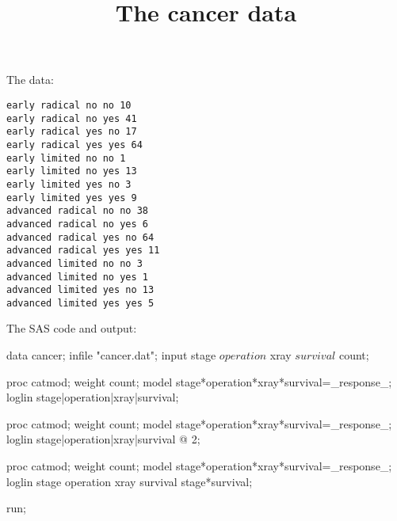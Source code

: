 \documentclass{article}
\title{The cancer data}
\begin{document}
\maketitle
The data:
\begin{verbatim}
early radical no no 10
early radical no yes 41
early radical yes no 17
early radical yes yes 64
early limited no no 1
early limited no yes 13
early limited yes no 3
early limited yes yes 9
advanced radical no no 38
advanced radical no yes 6
advanced radical yes no 64
advanced radical yes yes 11
advanced limited no no 3
advanced limited no yes 1
advanced limited yes no 13
advanced limited yes yes 5
\end{verbatim}
The SAS code and output:
\begin{Winput}
	data cancer;
	  infile "cancer.dat";
	  input stage $ operation $ xray $ survival $ count;

proc catmod;
  weight count;
  model stage*operation*xray*survival=_response_;
  loglin stage|operation|xray|survival;

proc catmod;
  weight count;
  model stage*operation*xray*survival=_response_;
  loglin stage|operation|xray|survival @ 2;

proc catmod;
  weight count;
  model stage*operation*xray*survival=_response_;
  loglin stage operation xray survival stage*survival;

run;
\end{Winput}
\end{document}
